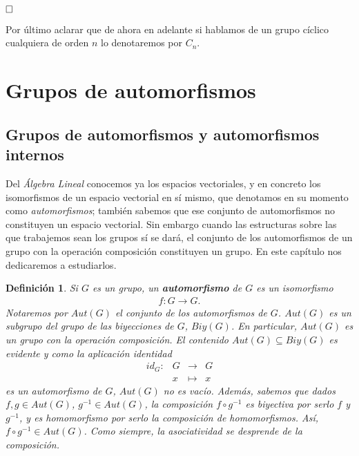 \documentclass[12pt]{article}
\newtheorem{definition}[theorem]{Definición}
\begin{document}
$\hfill \square$

Por último aclarar que de ahora en adelante si hablamos de un grupo cíclico cualquiera de orden $n$ lo denotaremos por $C_{n}.$

\section{Grupos de automorfismos}

\subsection{Grupos de automorfismos y automorfismos internos}

Del \textit{Álgebra Lineal} conocemos ya los espacios vectoriales, y en concreto los isomorfismos de un espacio vectorial en sí mismo, que denotamos en su momento como \textit{automorfismos}; también sabemos que ese conjunto de automorfismos no constituyen un espacio vectorial. Sin embargo cuando las estructuras sobre las que trabajemos sean los grupos sí se dará, el conjunto de los automorfismos de un grupo con la operación composición constituyen un grupo. En este capítulo nos dedicaremos a estudiarlos.

\begin{definition}Si $G$ es un grupo, un \textbf{automorfismo} de $G$ es un isomorfismo $$\begin{array}{rccl}
f\colon G \longrightarrow G.
\end{array}
$$ Notaremos por $Aut(G)$ el conjunto de los automorfismos de $G$. $Aut(G)$ es un subgrupo del grupo de las biyecciones de $G$, $Biy(G)$. En particular, $Aut(G)$ es un grupo con la operación composición. El contenido $Aut(G) \subseteq Biy(G)$ es evidente y como la aplicación identidad $$\begin{array}{rccl}
id_{G}\colon &G& \longrightarrow &G\\
&x& \longmapsto &x
\end{array}
$$ es un automorfismo de $G$, $Aut(G)$ no es vacío. Además, sabemos que dados $f, g \in Aut(G)$, $g^{-1} \in Aut(G)$, la composición $f \circ g^{-1}$ es biyectiva por serlo $f$ y $g^{-1}$, y es homomorfismo por serlo la composición de homomorfismos. Así, $f \circ g^{-1} \in Aut(G)$. Como siempre, la asociatividad se desprende de la composición.
\end{definition}
\end{document}
